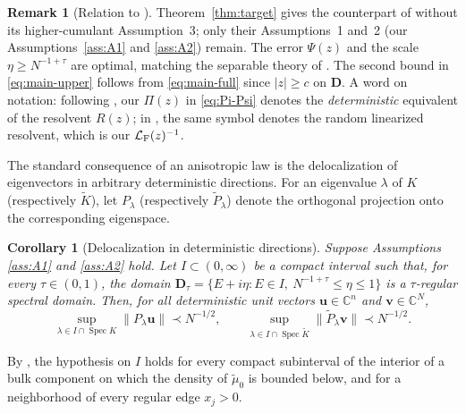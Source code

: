 \documentclass[11pt,reqno]{amsart}
\def\u{\mathbf{u}}
\def\bv{\mathbf{v}}
\def\C{\mathbb{C}}
\def\bD{\mathbf{D}}
\newtheorem{coro}[theorem]{Corollary}
\theoremstyle{definition}
\newtheorem{remark}[theorem]{Remark}
\numberwithin{equation}{section}
\numberwithin{figure}{section}
\begin{document}
\begin{remark}[Relation to \cite{fan2026anisotropic}]\label{rem:fmpw-comparison}
Theorem~\ref{thm:target} gives the counterpart of \cite[Theorem~2.8]{fan2026anisotropic} without its higher-cumulant Assumption~3; only their Assumptions~1 and~2 (our Assumptions~\ref{ass:A1} and \ref{ass:A2}) remain. The error $\Psi(z)$ and the scale $\eta\ge N^{-1+\tau}$ are optimal, matching the separable theory of \cite{knowles2017anisotropic}. The second bound in \eqref{eq:main-upper} follows from \eqref{eq:main-full} since $|z|\ge c$ on $\bD$. A word on notation: following \cite{knowles2017anisotropic}, our $\Pi(z)$ in \eqref{eq:Pi-Psi} denotes the \emph{deterministic} equivalent of the resolvent $R(z)$; in \cite{fan2026anisotropic}, the same symbol denotes the random linearized resolvent, which is our $\mathcal L_{\rm F}(z)^{-1}$.
\end{remark}

The standard consequence of an anisotropic law is the delocalization of eigenvectors in arbitrary deterministic directions. For an eigenvalue $\lambda$ of $K$ (respectively $\widetilde K$), let $P_\lambda$ (respectively $\widetilde P_\lambda$) denote the orthogonal projection onto the corresponding eigenspace.

\begin{coro}[Delocalization in deterministic directions]\label{cor:delocalization}
Suppose Assumptions \ref{ass:A1} and \ref{ass:A2} hold. Let $I\subset(0,\infty)$ be a compact interval such that, for every $\tau\in(0,1)$, the domain $\bD_\tau=\{E+i\eta:E\in I,\ N^{-1+\tau}\le\eta\le1\}$ is a $\tau$-regular spectral domain. Then, for all deterministic unit vectors $\u\in\C^n$ and $\bv\in\C^N$,
\[
 \sup_{\lambda\in I\cap\operatorname{Spec}K}\|P_\lambda\u\|
 \prec N^{-1/2},\qquad
 \sup_{\lambda\in I\cap\operatorname{Spec}\widetilde K}
 \|\widetilde P_\lambda\bv\|\prec N^{-1/2}.
\]
\end{coro}

By \cite[Lemma~2.4]{fan2026anisotropic}, the hypothesis on $I$ holds for every compact subinterval of the interior of a bulk component on which the density of $\widetilde\mu_0$ is bounded below, and for a neighborhood of every regular edge $x_j>0$.
\end{document}
